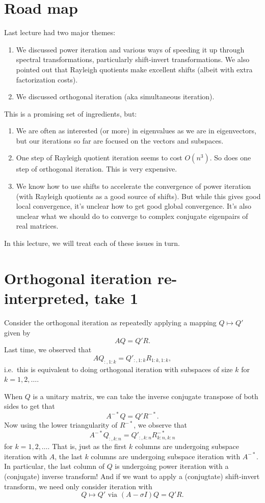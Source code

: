 \documentclass[12pt, leqno]{article} %
\begin{document}

\section{Road map}

Last lecture had two major themes:
\begin{enumerate}
\item
  We discussed power iteration and various ways of speeding it up
  through spectral transformations, particularly shift-invert
  transformations.  We also pointed out that Rayleigh quotients make
  excellent shifts (albeit with extra factorization costs).
\item
  We discussed orthogonal iteration (aka simultaneous iteration).
\end{enumerate}
This is a promising set of ingredients, but:
\begin{enumerate}
\item
  We are often as interested (or more) in eigenvalues as we are in
  eigenvectors, but our iterations so far are focused on the vectors
  and subspaces.
\item
  One step of Rayleigh quotient iteration seems to cost $O(n^3)$.  So
  does one step of orthogonal iteration.  This is very expensive.
\item
  We know how to use shifts to accelerate the convergence of power
  iteration (with Rayleigh quotients as a good source of shifts).  But
  while this gives good local convergence, it's unclear how to get
  good global convergence.  It's also unclear what we should do to
  converge to complex conjugate eigenpairs of real matrices.
\end{enumerate}
In this lecture, we will treat each of these issues in turn.

\section{Orthogonal iteration re-interpreted, take 1}

Consider the orthogonal iteration as repeatedly applying a mapping
$Q \mapsto Q'$ given by
\[
  AQ = Q'R.
\]
Last time, we observed that
\[
  AQ_{:,1:k} = Q'_{:,1:k} R_{1:k,1:k},
\]
i.e.~this is equivalent to doing orthogonal iteration with subspaces
of size $k$ for $k = 1, 2, \ldots$.

When $Q$ is a unitary matrix, we can take the inverse conjugate
transpose of both sides to get that
\[
  A^{-*} Q = Q' R^{-*}.
\]
Now using the lower triangularity of $R^{-*}$, we observe that
\[
  A^{-*} Q_{:,k:n} = Q'_{:,k:n} R_{k:n,k:n}^{-*}
\]
for $k = 1, 2, \ldots$.  That is, just as the first $k$ columns are
undergoing subspace iteration with $A$, the last $k$ columns are
undergoing subspace iteration with $A^{-*}$.  In particular, the last
column of $Q$ is undergoing power iteration with a (conjugate) inverse
transform!  And if we want to apply a (conjugtate) shift-invert
transform, we need only consider iteration with
\[
  Q \mapsto Q' \mbox{ via } (A-\sigma I) Q = Q'R.
\]
\end{document}

